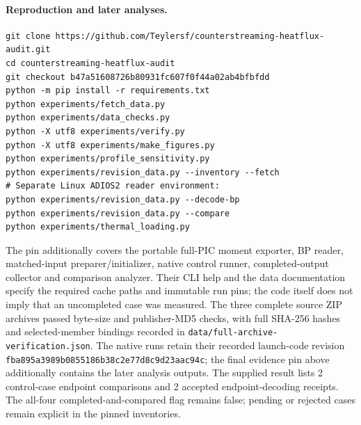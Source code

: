 \paragraph{Reproduction and later analyses.}
\begin{verbatim}
git clone https://github.com/Teylersf/counterstreaming-heatflux-audit.git
cd counterstreaming-heatflux-audit
git checkout b47a51608726b80931fc607f0f44a02ab4bfbfdd
python -m pip install -r requirements.txt
python experiments/fetch_data.py
python experiments/data_checks.py
python -X utf8 experiments/verify.py
python -X utf8 experiments/make_figures.py
python experiments/profile_sensitivity.py
python experiments/revision_data.py --inventory --fetch
# Separate Linux ADIOS2 reader environment:
python experiments/revision_data.py --decode-bp
python experiments/revision_data.py --compare
python experiments/thermal_loading.py
\end{verbatim}
The pin additionally covers the portable full-PIC moment exporter, BP reader, matched-input preparer/initializer, native control runner, completed-output collector and comparison analyzer. Their CLI help and the data documentation specify the required cache paths and immutable run pins; the code itself does not imply that an uncompleted case was measured.
The three complete source ZIP archives passed byte-size and publisher-MD5 checks, with full SHA-256 hashes and selected-member bindings recorded in \nolinkurl{data/full-archive-verification.json}.
The native runs retain their recorded launch-code revision \texttt{fba895a3989b0855186b38c2e77d8c9d23aac94c}; the final evidence pin above additionally contains the later analysis outputs.
The supplied result lists 2 control-case endpoint comparisons and 2 accepted endpoint-decoding receipts. The all-four completed-and-compared flag remains false; pending or rejected cases remain explicit in the pinned inventories.
